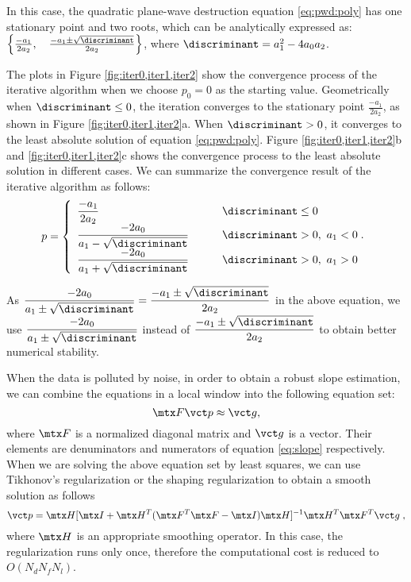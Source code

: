 In this case, 
the quadratic plane-wave destruction equation \ref{eq:pwd:poly} 
has one stationary point and two roots, 
which can be analytically expressed as:
$\left\{
 \frac{-a_1}{2a_2},\quad
 \frac{-a_1\pm\sqrt{\discriminant}}{2a_2}
\right\}
$, where $\discriminant=a_1^2-4a_0a_2$.




The plots in Figure \ref{fig:iter0,iter1,iter2} show the convergence process
of the iterative algorithm when we choose $p_0=0$ as the starting value.
Geometrically when $\discriminant\leq 0$, 
the iteration converges to the stationary point $\displaystyle{\frac{-a_1}{2a_2}}$,
as shown in Figure \ref{fig:iter0,iter1,iter2}a.
When $\discriminant >0$, 
it converges to the least absolute solution of equation \ref{eq:pwd:poly}.
Figure \ref{fig:iter0,iter1,iter2}b and \ref{fig:iter0,iter1,iter2}c 
shows the convergence process 
to the least absolute solution in different cases.
We can summarize the convergence result of the iterative algorithm as follows:
\begin{equation}\label{eq:slope}
p=\left\{\begin{array}{ll}
\displaystyle{\frac{-a_1}{2a_2}}  & \discriminant\leq 0\\
\displaystyle{\frac{-2a_0}{a_1-\sqrt{\discriminant}}} \qquad 
& \discriminant >0, ~a_1<0\;.\\
\displaystyle{\frac{-2a_0}{a_1+\sqrt{\discriminant}}}  
& \discriminant >0, ~a_1>0\\
\end{array}\right.
\end{equation}

As $\displaystyle{\frac{-2a_0}{a_1\pm\sqrt{\discriminant}}=
\frac{-a_1\pm\sqrt{\discriminant}}{2a_2}}$
in the above equation, we use 
$\displaystyle{\frac{-2a_0}{a_1\pm\sqrt{\discriminant}}}$
instead of 
$\displaystyle{\frac{-a_1\pm\sqrt{\discriminant}}{2a_2}}$
to obtain better numerical stability.



When the data is polluted by noise,
in order to obtain a robust slope estimation,
we can combine the equations in a local window into the following equation set:
\begin{equation}
\mtx F \vct p \approx \vct g,
\end{equation}
where $\mtx F$ is a normalized diagonal matrix and $\vct g$ is a vector.
Their elements are denuminators and numerators of 
equation \ref{eq:slope} respectively.
When we are solving the above equation set by least squares,
we can use Tikhonov's regularization \cite[]{fomel:1946} or
the shaping regularization \cite[~equation 13]{fomel:R29}
to obtain a smooth solution as follows
\begin{equation}
\vct p = \mtx H
[\mtx I+\mtx H^T (\mtx F^T\mtx F-\mtx I)\mtx H]^{-1}
\mtx H^T\mtx F^T \vct g\;,
\end{equation}
where $\mtx H$ is an appropriate smoothing operator.
In this case, the regularization runs only once,
therefore the computational cost is reduced to $O(N_dN_fN_l)$.

